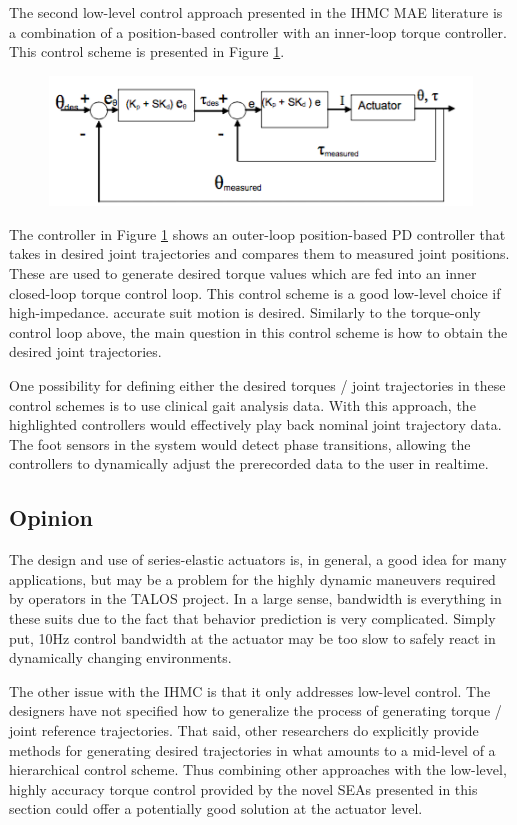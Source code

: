  The second low-level control approach presented in the IHMC MAE literature is a combination of a position-based controller with an inner-loop torque controller.  This control scheme is presented in Figure \ref{fig:IHMCPOS}.
  \begin{figure}[thpb]
\centering
\includegraphics[width=3.in]{exos/figs/ihmc/positionCon}
  \caption{}
  \vspace{-0.2in}
 \label{fig:IHMCPOS}   
 \end{figure}
 The controller in Figure \ref{fig:IHMCPOS} shows an outer-loop position-based PD controller that takes in desired joint trajectories and compares them to measured joint positions.  These are used to generate desired torque values which are fed into an inner closed-loop torque control loop.  This control scheme is a good low-level choice if high-impedance. accurate suit motion is desired.  Similarly to the torque-only control loop above, the main question in this control scheme is how to obtain the desired joint trajectories.  
 
 One possibility for defining either the desired torques / joint trajectories in these control schemes is to use clinical gait analysis data.  With this approach, the highlighted controllers would effectively play back nominal joint trajectory data.  The foot sensors in the system would detect phase transitions, allowing the controllers to dynamically adjust the prerecorded data to the user in realtime.
 
 
 \subsection{Opinion}
 
 The design and use of series-elastic actuators is, in general, a good idea for many applications, but may be a problem for the highly dynamic maneuvers required by operators in the TALOS project.  In a large sense, bandwidth is everything in these suits due to the fact that behavior prediction is very complicated.  Simply put, 10Hz control bandwidth at the actuator may be too slow to safely react in dynamically changing environments. 
 
 The other issue with the IHMC is that it only addresses low-level control.  The designers have not specified how to generalize the process of generating torque / joint reference trajectories.  That said, other researchers do explicitly provide methods for generating desired trajectories in what amounts to a mid-level of a hierarchical control scheme.  Thus combining other approaches with the low-level, highly accuracy torque control provided by the novel SEAs presented in this section could offer a potentially good solution at the actuator level. 
 


